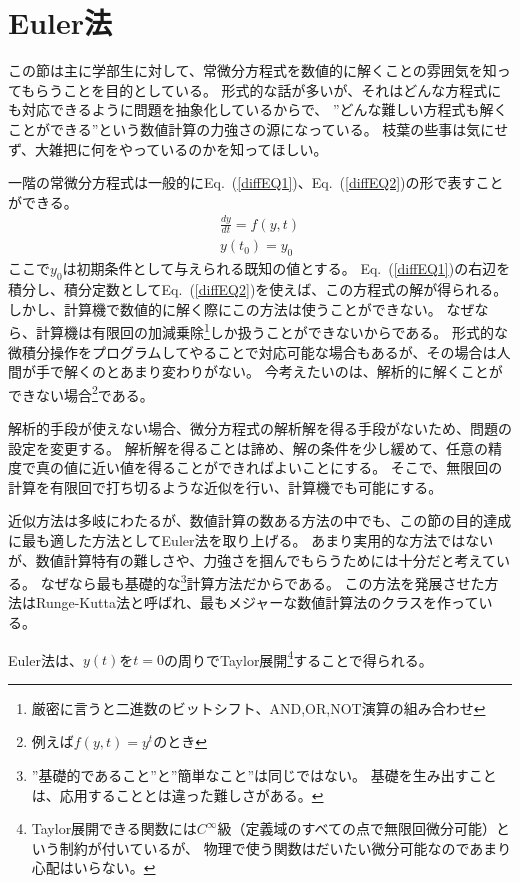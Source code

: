 \documentclass[autodetect-engine,dvipdfmx-if-dvi,ja=standard,a4paper,layout=v2]{bxjsreport}
\newcommand{\eref}[1]{Eq.~(\ref{#1})}
\begin{document}
    \section{Euler法}
    この節は主に学部生に対して、常微分方程式を数値的に解くことの雰囲気を知ってもらうことを目的としている。
    形式的な話が多いが、それはどんな方程式にも対応できるように問題を抽象化しているからで、
    ”どんな難しい方程式も解くことができる”という数値計算の力強さの源になっている。
    枝葉の些事は気にせず、大雑把に何をやっているのかを知ってほしい。\par
    一階の常微分方程式は一般的に\eref{diffEQ1}、\eref{diffEQ2}の形で表すことができる。
    \begin{align}
      \frac{dy}{dt} = f(y,t)\label{diffEQ1}\\
      y(t_0) = y_0\label{diffEQ2}
    \end{align}
    ここで$y_0$は初期条件として与えられる既知の値とする。
    \eref{diffEQ1}の右辺を積分し、積分定数として\eref{diffEQ2}を使えば、この方程式の解が得られる。
    しかし、計算機で数値的に解く際にこの方法は使うことができない。
    なぜなら、計算機は有限回の加減乗除\footnote{
      厳密に言うと二進数のビットシフト、AND,OR,NOT演算の組み合わせ
    }しか扱うことができないからである。
    形式的な微積分操作をプログラムしてやることで対応可能な場合もあるが、その場合は人間が手で解くのとあまり変わりがない。
    今考えたいのは、解析的に解くことができない場合\footnote{
      例えば$f(y,t)=y^t$のとき
    }である。\par
    解析的手段が使えない場合、微分方程式の解析解を得る手段がないため、問題の設定を変更する。
    解析解を得ることは諦め、解の条件を少し緩めて、任意の精度で真の値に近い値を得ることができればよいことにする。
    そこで、無限回の計算を有限回で打ち切るような近似を行い、計算機でも可能にする。\par
    近似方法は多岐にわたるが、数値計算の数ある方法の中でも、この節の目的達成に最も適した方法としてEuler法を取り上げる。
    あまり実用的な方法ではないが、数値計算特有の難しさや、力強さを掴んでもらうためには十分だと考えている。
    なぜなら最も基礎的な\footnote{
      ”基礎的であること”と”簡単なこと”は同じではない。
      基礎を生み出すことは、応用することとは違った難しさがある。
    }計算方法だからである。
    この方法を発展させた方法はRunge-Kutta法と呼ばれ、最もメジャーな数値計算法のクラスを作っている。\par
    Euler法は、$y(t)$を$t=0$の周りでTaylor展開\footnote{
      Taylor展開できる関数には$C^\infty$級（定義域のすべての点で無限回微分可能）という制約が付いているが、
      物理で使う関数はだいたい微分可能なのであまり心配はいらない。
    }することで得られる。
\end{document}
